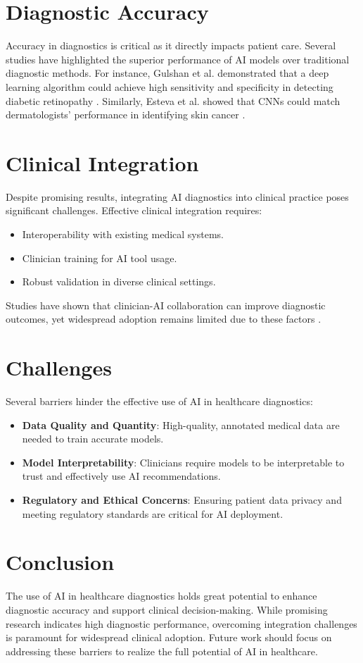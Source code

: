 \documentclass[12pt]{article}
\begin{document}
\section{Diagnostic Accuracy}
Accuracy in diagnostics is critical as it directly impacts patient care. Several studies have highlighted the superior performance of AI models over traditional diagnostic methods. For instance, Gulshan et al. demonstrated that a deep learning algorithm could achieve high sensitivity and specificity in detecting diabetic retinopathy \cite{gulshan2016development}. Similarly, Esteva et al. showed that CNNs could match dermatologists' performance in identifying skin cancer \cite{esteva2017dermatologist}.

\section{Clinical Integration}
Despite promising results, integrating AI diagnostics into clinical practice poses significant challenges. Effective clinical integration requires:
\begin{itemize}
    \item Interoperability with existing medical systems.
    \item Clinician training for AI tool usage.
    \item Robust validation in diverse clinical settings.
\end{itemize}
Studies have shown that clinician-AI collaboration can improve diagnostic outcomes, yet widespread adoption remains limited due to these factors \cite{topol2019high}.

\section{Challenges}
Several barriers hinder the effective use of AI in healthcare diagnostics:
\begin{itemize}
    \item \textbf{Data Quality and Quantity}: High-quality, annotated medical data are needed to train accurate models. 
    \item \textbf{Model Interpretability}: Clinicians require models to be interpretable to trust and effectively use AI recommendations.
    \item \textbf{Regulatory and Ethical Concerns}: Ensuring patient data privacy and meeting regulatory standards are critical for AI deployment.
\end{itemize}

\section{Conclusion}
The use of AI in healthcare diagnostics holds great potential to enhance diagnostic accuracy and support clinical decision-making. While promising research indicates high diagnostic performance, overcoming integration challenges is paramount for widespread clinical adoption. Future work should focus on addressing these barriers to realize the full potential of AI in healthcare.



\end{document}

